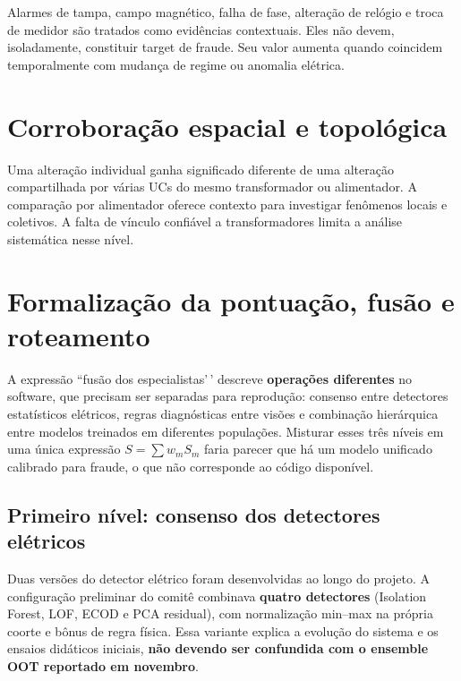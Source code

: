 Alarmes de tampa, campo magnético, falha de fase, alteração de relógio e troca de medidor são tratados como evidências contextuais. Eles não devem, isoladamente, constituir target de fraude. Seu valor aumenta quando coincidem temporalmente com mudança de regime ou anomalia elétrica.

\section{Corroboração espacial e topológica}\label{corroborauxe7uxe3o-espacial-e-topoluxf3gica}

Uma alteração individual ganha significado diferente de uma alteração compartilhada por várias UCs do mesmo transformador ou alimentador. A comparação por alimentador oferece contexto para investigar fenômenos locais e coletivos. A falta de vínculo confiável a transformadores limita a análise sistemática nesse nível.

\section{Formalização da pontuação, fusão e roteamento}\label{formalizauxe7uxe3o-da-pontuauxe7uxe3o-fusuxe3o-e-roteamento}

A expressão ``fusão dos especialistas'\,' descreve \textbf{operações diferentes} no software, que precisam ser separadas para reprodução: consenso entre detectores estatísticos elétricos, regras diagnósticas entre visões e combinação hierárquica entre modelos treinados em diferentes populações. Misturar esses três níveis em uma única expressão \(S=\sum w_m S_m\) faria parecer que há um modelo unificado calibrado para fraude, o que não corresponde ao código disponível.

\subsection{Primeiro nível: consenso dos detectores elétricos}\label{primeiro-nuxedvel-consenso-dos-detectores-eluxe9tricos}

Duas versões do detector elétrico foram desenvolvidas ao longo do projeto. A configuração preliminar do comitê combinava \textbf{quatro detectores} (Isolation Forest, LOF, ECOD e PCA residual), com normalização min--max na própria coorte e bônus de regra física. Essa variante explica a evolução do sistema e os ensaios didáticos iniciais, \textbf{não devendo ser confundida com o ensemble OOT reportado em novembro}.

